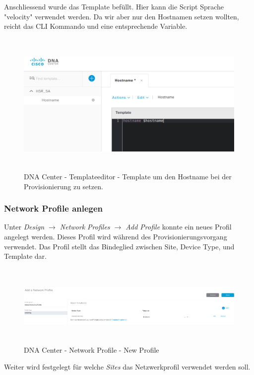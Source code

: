 Anschliessend wurde das Template befüllt. Hier kann die Script Sprache "velocity" verwendet werden. Da wir aber nur den Hostnamen setzen wollten, reicht das CLI Kommando und eine entsprechende Variable.

\begin{figure}[H]
	\centering
	\includegraphics[height=7cm]{img/secondtry/dna-center-template-editor-edit.png}
	\caption{DNA Center - Templateeditor - Template um den Hostname bei der Provisionierung zu setzen.}
	\label{fig:dna-center-template-editor-edit}
\end{figure}

\subsubsection{Network Profile anlegen}
Unter \textit{Design $\rightarrow$ Network Profiles $\rightarrow$ Add Profile} konnte ein neues Profil angelegt werden. Dieses Profil wird während des Provisionierungsvorgang verwendet. Das Profil stellt das Bindeglied zwischen Site, Device Type, und Template dar.

\begin{figure}[H]
	\centering
	\includegraphics[height=4cm]{img/secondtry/dna-center-network-profile-new.png}
	\caption{DNA Center - Network Profile - New Profile}
	\label{fig:dna-center-network-profile-new}
\end{figure}

Weiter wird festgelegt für welche \textit{Sites} das Netzwerkprofil verwendet werden soll. 

